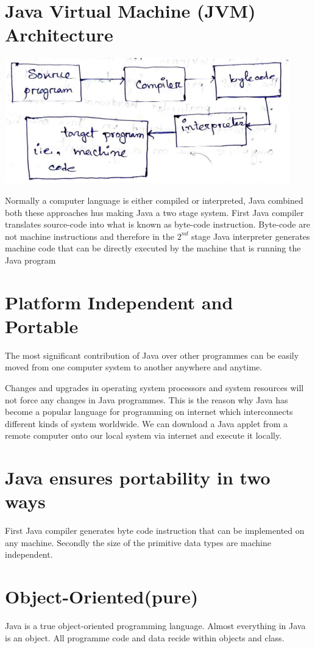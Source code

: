 \documentclass[11pt, a4paper]{book}
\begin{document}
    \section{Java Virtual Machine (JVM) Architecture}
      \includegraphics{JVMdiagram}
  
      Normally a computer language is either compiled or interpreted, Java combined both these approaches hus making Java a two stage system. First Java compiler translates source-code into what is known as byte-code instruction. Byte-code are not machine instructions and therefore in the $2^{nd}$ stage
      Java interpreter generates machine code that can be directly executed by the machine that is running the Java program
  
    \section{Platform Independent and Portable}
      The most significant contribution of Java over other programmes can be easily moved from one computer system to another anywhere and anytime.
  
      Changes and upgrades in operating system processors and system resources will not force any changes in Java programmes. This is the reason why Java has become a popular language for programming on internet which interconnects different kinds of system worldwide. We can download a Java applet from a
      remote computer onto our local system via internet and execute it locally.
    
    \section{Java ensures portability in two ways}
      First Java compiler generates byte code instruction that can be implemented on any machine. Secondly the size of the primitive data types are machine independent.
  
    \section{Object-Oriented(pure)}
      Java is a true object-oriented programming language. Almost everything in Java is an object. All programme code and data recide within objects and class.
  
\end{document}

